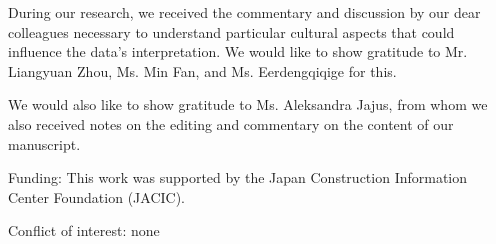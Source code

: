 \documentclass[smallextended,natbib]{svjour3}       %
\begin{document}
        \date{Received: date / Accepted: date}

        \maketitle

\begin{acknowledgements}

  During our research, we received the commentary and discussion by our dear colleagues necessary to understand particular cultural aspects that could influence the data's interpretation. We would like to show gratitude to Mr. Liangyuan Zhou, Ms. Min Fan, and Ms. Eerdengqiqige for this.

  We would also like to show gratitude to Ms. Aleksandra Jajus, from whom we also received notes on the editing and commentary on the content of our manuscript.

  \medskip

  Funding: This work was supported by the Japan Construction Information Center Foundation (JACIC).

  \medskip

  Conflict of interest: none

\end{acknowledgements}
\end{document}
